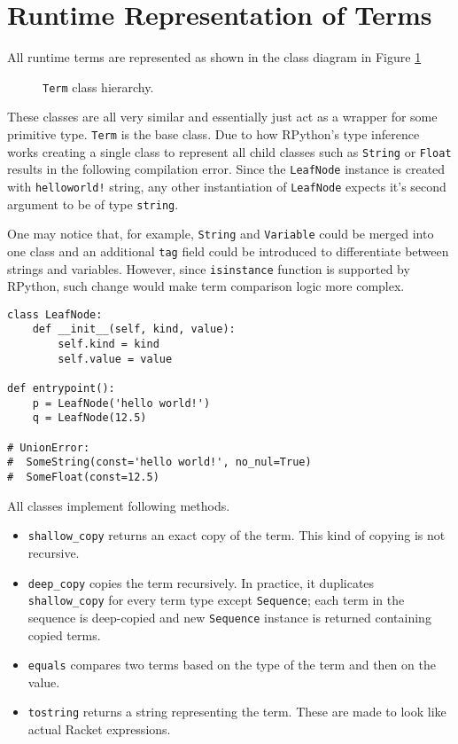 \section{Runtime Representation of Terms}
\label{section:runtime-terms}

All runtime terms are represented as shown in the class diagram in Figure \ref{class-diagram-runtime-term}

\begin{figure}[H]
	\centering
\caption{\texttt{Term} class hierarchy.}
\label{class-diagram-runtime-term}
\end{figure}

These classes are all very similar and essentially just act as a wrapper for some primitive type. \texttt{Term} is the base class. Due to how RPython's type inference works creating a single class to represent all child classes such as \texttt{String} or \texttt{Float} results in the following compilation error.  Since the \texttt{LeafNode} instance is created with \texttt{helloworld!} string, any other instantiation of \texttt{LeafNode} expects it's second argument to be of type \texttt{string}. 

One may notice that, for example, \texttt{String} and \texttt{Variable} could be merged into one class and an additional \texttt{tag} field could be introduced to differentiate between strings and variables. However, since \texttt{isinstance} function is supported by RPython, such change would make term comparison logic more complex.

\begin{verbatim}
class LeafNode:
    def __init__(self, kind, value):
        self.kind = kind 
        self.value = value

def entrypoint():
    p = LeafNode('hello world!')
    q = LeafNode(12.5)

# UnionError:
#  SomeString(const='hello world!', no_nul=True)
#  SomeFloat(const=12.5)
\end{verbatim}

All classes implement following methods.
\begin{itemize}
\item \texttt{shallow\_copy} returns an exact copy of the term. This kind of copying is not recursive.
\item
\texttt{deep\_copy} copies the term recursively. In practice, it duplicates \texttt{shallow\_copy} for every term type except \texttt{Sequence}; each term in the sequence is deep-copied and new \texttt{Sequence} instance is returned containing copied terms.
\item
\texttt{equals} compares two terms based on the type of the term and then on the value.
\item
\texttt{tostring} returns a string representing the term. These are made to look like actual Racket expressions.
\end{itemize}
 
